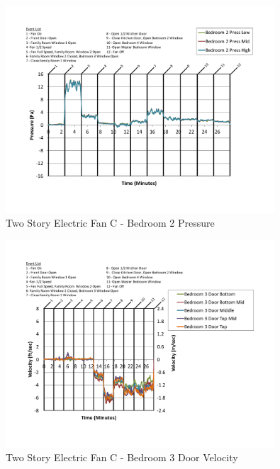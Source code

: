 \documentclass{article}
\begin{document}
\begin{appendices}
	\begin{figure}[H]
		\centering
		\includegraphics[height=3.05in,trim=0.67in 1.1in 0.67in 0.8in,clip=true]{0_Images/Results_Charts/ColdFlow/Two_Story/Electric/C/Bedroom_2_Pressure.pdf}
		\caption{Two Story Electric Fan C - Bedroom 2 Pressure}
	\end{figure}
 

	\begin{figure}[H]
		\centering
		\includegraphics[height=3.05in,trim=0.67in 1.1in 0.67in 0.8in,clip=true]{0_Images/Results_Charts/ColdFlow/Two_Story/Electric/C/Bedroom_3_Door_Velocity.pdf}
		\caption{Two Story Electric Fan C - Bedroom 3 Door Velocity}
	\end{figure}
 
	\clearpage


\end{appendices}
\end{document}
